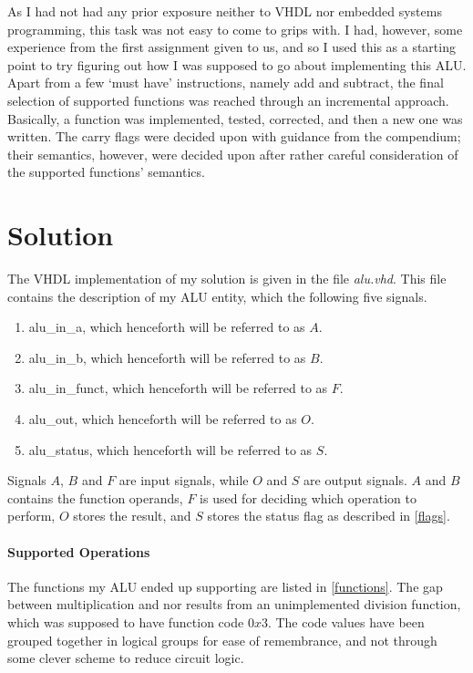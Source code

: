 \documentclass{article}
\begin{document}
As I had not had any prior exposure neither to VHDL nor embedded systems programming, this task was not easy to come to grips with. I had, however, some experience from the first assignment given to us, and so I used this as a starting point to try figuring out how I was supposed to go about implementing this ALU. Apart from a few `must have' instructions, namely add and subtract, the final selection of supported functions was reached through an incremental approach. Basically, a function was implemented, tested, corrected, and then a new one was written. The carry flags were decided upon with guidance from the compendium; their semantics, however, were decided upon after rather careful consideration of the supported functions' semantics. 

\section{Solution}
\label{sec:solution}
The VHDL implementation of my solution is given in the file \emph{alu.vhd}. This file contains the description of my ALU entity, which the following five signals.

\begin{enumerate} 
\item alu\_in\_a, which henceforth will be referred to as $A$.
\item alu\_in\_b, which henceforth will be referred to as $B$.
\item alu\_in\_funct, which henceforth will be referred to as $F$.
\item alu\_out, which henceforth will be referred to as $O$.
\item alu\_status, which henceforth will be referred to as $S$.
\end{enumerate}

Signals $A$, $B$ and $F$ are input signals, while $O$ and $S$ are output signals. $A$ and $B$ contains the function operands, $F$ is used for deciding which operation to perform, $O$ stores the result, and $S$ stores the status flag as described in \autoref{flags}.

\paragraph{Supported Operations}
\label{ops}
The functions my ALU ended up supporting are listed in \autoref{functions}. The gap between multiplication and nor results from an unimplemented division function, which was supposed to have function code $0x3$. The code values have been grouped together in logical groups for ease of remembrance, and not through some clever scheme to reduce circuit logic.
\end{document}
